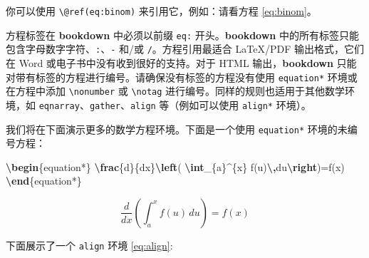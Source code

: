 \documentclass[
  12pt,
]{krantz}
\makeatletter
\newenvironment{Shaded}{\begin{snugshade}}{\end{snugshade}}
\newcommand{\ExtensionTok}[1]{#1}
\newcommand{\KeywordTok}[1]{\textcolor[rgb]{0.13,0.29,0.53}{\textbf{#1}}}
\newcommand{\NormalTok}[1]{#1}
\newcommand{\SpecialCharTok}[1]{\textcolor[rgb]{0.81,0.36,0.00}{\textbf{#1}}}
\newcommand{\SpecialStringTok}[1]{\textcolor[rgb]{0.31,0.60,0.02}{#1}}
\newenvironment{kframe}{%
\medskip{}
\setlength{\fboxsep}{.8em}
 \def\at@end@of@kframe{}%
 \ifinner\ifhmode%
  \def\at@end@of@kframe{\end{minipage}}%
  \begin{minipage}{\columnwidth}%
 \fi\fi%
 \def\FrameCommand##1{\hskip\@totalleftmargin \hskip-\fboxsep
 \colorbox{shadecolor}{##1}\hskip-\fboxsep
     \hskip-\linewidth \hskip-\@totalleftmargin \hskip\columnwidth}%
 \MakeFramed {\advance\hsize-\width
   \@totalleftmargin\z@ \linewidth\hsize
   \@setminipage}}%
 {\par\unskip\endMakeFramed%
 \at@end@of@kframe}
\newenvironment{rmdblock}[1]
  {
  \begin{itemize}
  \renewcommand{\labelitemi}{
    \raisebox{-.7\height}[0pt][0pt]{
      {\setkeys{Gin}{width=3em,keepaspectratio}\texttt{[image: images/\#1]}}
    }
  }
  \setlength{\fboxsep}{1em}
  \begin{kframe}
  \item
  }
  {
  \end{kframe}
  \end{itemize}
  }
\newenvironment{rmdcaution}
  {\begin{rmdblock}{caution}}
  {\end{rmdblock}}
\theoremstyle{definition}
\theoremstyle{definition}
\theoremstyle{definition}
\theoremstyle{definition}
\theoremstyle{remark}
\makeatother
\begin{document}
你可以使用 \texttt{\textbackslash{}@ref(eq:binom)} 来引用它，例如：请看方程 \eqref{eq:binom}。

\begin{rmdcaution}
方程标签在 \textbf{bookdown} 中必须以前缀 \texttt{eq:} 开头。\textbf{bookdown} 中的所有标签只能包含字母数字字符、\texttt{:}、\texttt{-} 和/或 \texttt{/}。方程引用最适合 LaTeX/PDF 输出格式，它们在 Word 或电子书中没有收到很好的支持。对于 HTML 输出，\textbf{bookdown} 只能对带有标签的方程进行编号。请确保没有标签的方程没有使用 \texttt{equation*} 环境或在方程中添加 \texttt{\textbackslash{}nonumber} 或 \texttt{\textbackslash{}notag} 进行编号。同样的规则也适用于其他数学环境，如 \texttt{eqnarray}、\texttt{gather}、\texttt{align} 等（例如可以使用 \texttt{align*} 环境）。
\end{rmdcaution}

我们将在下面演示更多的数学方程环境。下面是一个使用 \texttt{equation*} 环境的未编号方程：

\begin{Shaded}
\begin{Highlighting}[]
\KeywordTok{\textbackslash{}begin}\NormalTok{\{}\ExtensionTok{equation*}\NormalTok{\}}\SpecialStringTok{ }
\SpecialCharTok{\textbackslash{}frac}\SpecialStringTok{\{d\}\{dx\}}\SpecialCharTok{\textbackslash{}left}\SpecialStringTok{( }\SpecialCharTok{\textbackslash{}int}\SpecialStringTok{\_\{a\}\^{}\{x\} f(u)}\SpecialCharTok{\textbackslash{},}\SpecialStringTok{du}\SpecialCharTok{\textbackslash{}right}\SpecialStringTok{)=f(x)}
\KeywordTok{\textbackslash{}end}\NormalTok{\{}\ExtensionTok{equation*}\NormalTok{\} }
\end{Highlighting}
\end{Shaded}

\begin{equation*}
\frac{d}{dx}\left( \int_{a}^{x} f(u)\,du\right)=f(x)
\end{equation*}

下面展示了一个 \texttt{align} 环境 \eqref{eq:align}:
\end{document}
